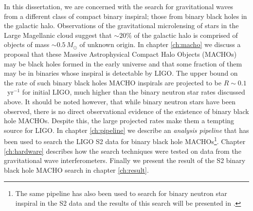 In this dissertation, we are concerned with the
search for gravitational waves from a different class of compact binary
inspiral; those from binary black holes in the galactic halo. Observations of
the gravitational microlensing of stars in the Large Magellanic cloud suggest
that $\sim 20\%$ of the galactic halo is comprised of objects of mass $\sim
0.5\,M_\odot$ of unknown origin. In chapter \ref{ch:macho} we discuss a
proposal that these Massive Astrophysical Compact Halo Objects (MACHOs) may be
black holes formed in the early universe and that some fraction of them may be
in binaries whose inspiral is detectable by LIGO\cite{Nakamura:1997sm}.  The
upper bound on the rate of such binary black holes MACHO inspirals are
projected to be $R \sim 0.1$~yr$^{-1}$ for initial LIGO, much higher than the
binary neutron star rates discussed above. It should be noted however, that
while binary neutron stars have been observed, there is no direct
observational evidence of the existence of binary black hole MACHOs. Despite
this, the large projected rates make them a tempting source for LIGO. In
chapter \ref{ch:pipeline} we describe an \emph{analysis pipeline} that has
been used to search the LIGO S2 data for binary black hole MACHOs\footnote{The
same pipeline has also been used to search for binary neutron star inspiral in
the S2 data and the results of this search will be presented in
\cite{LIGOS2iul}.}. Chapter \ref{ch:hardware} describes how the search
techniques were tested on data from the gravitational wave interferometers.
Finally we present the result of the S2 binary black hole MACHO search in
chapter \ref{ch:result}. 
